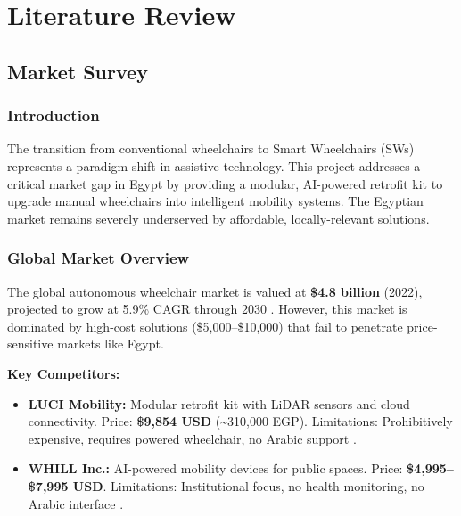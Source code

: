 \documentclass[12pt,a4paper]{report}
\begin{document}
\chapter{Literature Review}

\section{Market Survey}

\subsection{Introduction}

The transition from conventional wheelchairs to Smart Wheelchairs (SWs) represents a paradigm shift in assistive technology. This project addresses a critical market gap in Egypt by providing a modular, AI-powered retrofit kit to upgrade manual wheelchairs into intelligent mobility systems. The Egyptian market remains severely underserved by affordable, locally-relevant solutions.

\subsection{Global Market Overview}

The global autonomous wheelchair market is valued at \textbf{\$4.8 billion} (2022), projected to grow at 5.9\% CAGR through 2030 \cite{grandview_market}. However, this market is dominated by high-cost solutions (\$5,000--\$10,000) that fail to penetrate price-sensitive markets like Egypt.

\textbf{Key Competitors:}

\begin{itemize}
    \item \textbf{LUCI Mobility:} Modular retrofit kit with LiDAR sensors and cloud connectivity. Price: \textbf{\$9,854 USD} (\textasciitilde310,000 EGP). Limitations: Prohibitively expensive, requires powered wheelchair, no Arabic support \cite{lidar_costs}.
    \item \textbf{WHILL Inc.:} AI-powered mobility devices for public spaces. Price: \textbf{\$4,995--\$7,995 USD}. Limitations: Institutional focus, no health monitoring, no Arabic interface \cite{grandview_market}.
\end{itemize}
\end{document}

